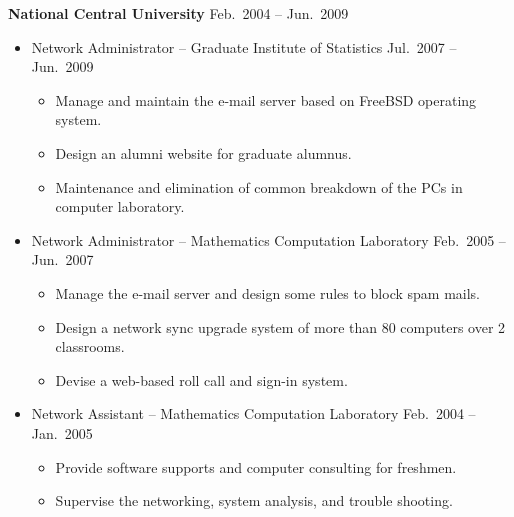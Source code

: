 \documentclass[a4paper,10pt,dvipdfmx]{article}
\begin{document}
\textbf{National Central University} \hfill Feb.~2004 -- Jun.~2009
\begin{itemize}[noitemsep,nolistsep]
  \item[] Network Administrator -- Graduate Institute of Statistics \hfill Jul.~2007 -- Jun.~2009
    \begin{itemize}[noitemsep,nolistsep]
      \item Manage and maintain the e-mail server based on FreeBSD operating system.
      \item Design an alumni website for graduate alumnus.
      \item Maintenance and elimination of common breakdown of the PCs in computer laboratory.
    \end{itemize}
  \item[] Network Administrator -- Mathematics Computation Laboratory \hfill Feb.~2005 -- Jun.~2007
    \begin{itemize}[noitemsep,nolistsep]
      \item Manage the e-mail server and design some rules to block spam mails.
      \item Design a network sync upgrade system of more than 80 computers over 2 classrooms.
      \item Devise a web-based roll call and sign-in system.
    \end{itemize}
  \item[] Network Assistant -- Mathematics Computation Laboratory \hfill Feb.~2004 -- Jan.~2005
    \begin{itemize}[noitemsep,nolistsep]
      \item Provide software supports and computer consulting for freshmen.
      \item Supervise the networking, system analysis, and trouble shooting.
    \end{itemize}
\end{itemize}

\newpage
\end{document}
